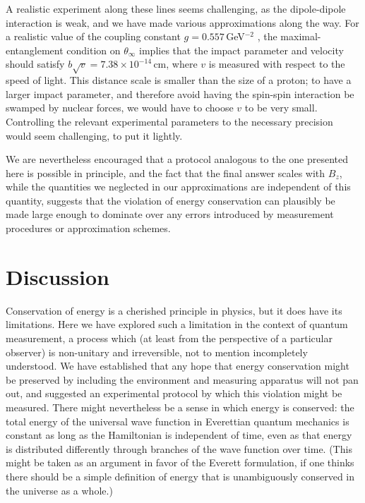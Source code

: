 \documentclass[aps,prd,onecolumn,nofootinbib,notitlepage]{revtex4-1}
\begin{document}
A realistic experiment along these lines seems challenging, as the dipole-dipole interaction is weak, and we have made various approximations along the way.
For a realistic value of the coupling constant $g= 0.557\,$GeV$^{-2}$ \cite{levitt2015, gamman, gammap}, the maximal-entanglement condition on $\theta_\infty$ implies that the impact parameter and velocity should satisfy $b\sqrt{v} = 7.38\times 10^{-14}\,$cm, where $v$ is measured with respect to the speed of light. 
This distance scale is smaller than the size of a proton; to have a larger impact parameter, and therefore avoid having the spin-spin interaction be swamped by nuclear forces, we would have to choose $v$ to be very small.
Controlling the relevant experimental parameters to the necessary precision would seem challenging, to put it lightly.

We are nevertheless encouraged that a protocol analogous to the one presented here is possible in principle, and the fact that the final answer scales with $B_z$, while the quantities we neglected in our approximations are independent of this quantity, suggests that the violation of energy conservation can plausibly be made large enough to dominate over any errors introduced by measurement procedures or approximation schemes.


\section{Discussion}

Conservation of energy is a cherished principle in physics, but it does have its limitations.
Here we have explored such a limitation in the context of quantum measurement, a process which (at least from the perspective of a particular observer) is non-unitary and irreversible, not to mention incompletely understood.
We have established that any hope that energy conservation might be preserved by including the environment and measuring apparatus will not pan out, and suggested an experimental protocol by which this violation might be measured.
There might nevertheless be a sense in which energy is conserved: the total energy of the universal wave function in Everettian quantum mechanics is constant as long as the Hamiltonian is independent of time, even as that energy is distributed differently through branches of the wave function over time.
(This might be taken as an argument in favor of the Everett formulation, if one thinks there should be a simple definition of energy that is unambiguously conserved in the universe as a whole.)
\end{document}
